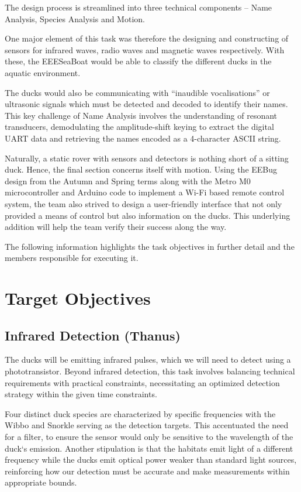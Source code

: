 The design process is streamlined into three technical components – Name Analysis, Species Analysis and Motion.

One major element of this task was therefore the designing and constructing of sensors for infrared waves, radio waves and magnetic waves respectively. With these, the EEESeaBoat would be able to classify the different ducks in the aquatic environment.

The ducks would also be communicating with “inaudible vocalisations” or ultrasonic signals which must be detected and decoded to identify their names. This key challenge of Name Analysis involves the understanding of resonant transducers, demodulating the amplitude-shift keying to extract the digital UART data and retrieving the names encoded as a 4-character ASCII string.

Naturally, a static rover with sensors and detectors is nothing short of a sitting duck. Hence, the final section concerns itself with motion. Using the EEBug design from the Autumn and Spring terms along with the Metro M0 microcontroller and Arduino code to implement a Wi-Fi based remote control system, the team also strived to design a user-friendly interface that not only provided a means of control but also information on the ducks. This underlying addition will help the team verify their success along the way.

The following information highlights the task objectives in further detail and the members responsible for executing it.

\section{Target Objectives}

\subsection*{Infrared Detection (Thanus)}

The ducks will be emitting infrared pulses, which we will need to detect using a phototransistor. Beyond infrared detection, this task involves balancing technical requirements with practical constraints, necessitating an optimized detection strategy within the given time constraints.

Four distinct duck species are characterized by specific frequencies with the Wibbo and Snorkle serving as the detection targets. This accentuated the need for a filter, to ensure the sensor would only be sensitive to the wavelength of the duck`s emission. Another stipulation is that the habitats emit light of a different frequency while the ducks emit optical power weaker than standard light sources, reinforcing how our detection must be accurate and make measurements within appropriate bounds.

